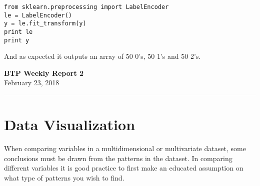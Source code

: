\documentclass[11pt,letterpaper]{article}
\begin{document}
\begin{lstlisting}
from sklearn.preprocessing import LabelEncoder
le = LabelEncoder()
y = le.fit_transform(y)
print le
print y
\end{lstlisting}

\noindent
And as expected it outputs an array of 50 0's, 50 1's and 50 2's.








\bigskip
\bigskip

\bigskip
\bigskip
\bigskip
\bigskip
\bigskip
\bigskip

\bigskip
\bigskip
\bigskip

\begin{center}\vspace{-1cm}
\textbf{ \large BTP Weekly Report 2}\\
February 23, 2018
\end{center}

\rule{\linewidth}{0.1mm}



\flushbottom
\maketitle

\thispagestyle{empty}


\section*{Data Visualization}

When comparing variables in a multidimensional
or multivariate dataset, some conclusions must
be drawn from the patterns in the dataset. In
comparing different variables it is good practice
to first make an educated assumption on what
type of patterns you wish to find. 
\end{document}
